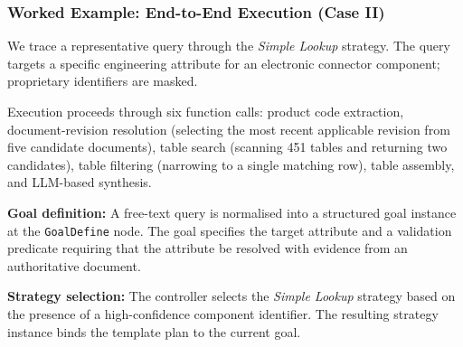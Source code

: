 \documentclass[largeformat]{interact}
\begin{document}
\subsubsection{Worked Example: End-to-End Execution (Case II)}
We trace a representative query through the \emph{Simple Lookup} strategy. The query targets a specific engineering attribute for an electronic connector component; proprietary identifiers are masked.

Execution proceeds through six function calls: product code extraction, document-revision resolution (selecting the most recent applicable revision from five candidate documents), table search (scanning 451 tables and returning two candidates), table filtering (narrowing to a single matching row), table assembly, and LLM-based synthesis.

\noindent \textbf{Goal definition:}
A free-text query is normalised into a structured goal instance at the \texttt{GoalDefine} node. The goal specifies the target attribute and a validation predicate requiring that the attribute be resolved with evidence from an authoritative document.

\noindent \textbf{Strategy selection:}
The controller selects the \emph{Simple Lookup} strategy based on the presence of a high-confidence component identifier. The resulting strategy instance binds the template plan to the current goal.
\end{document}
